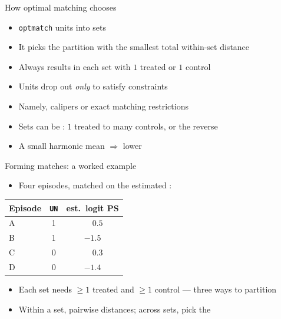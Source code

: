 \documentclass[table, xcolor = {dvipsnames}, 9pt]{beamer}
\theoremstyle{plain}
\newcommand{\mh}[1]{{\color{magenta}{#1}}}
\begin{document}
\begin{frame}[t]{How optimal matching chooses}
\vfill
\begin{itemize} \vfill
\item \texttt{optmatch} \mh{partitions} units into sets \citep{hansen2004} \vfill
\item It picks the partition with the smallest total within-set distance \\ \citep{rosenbaum1991,gurosenbaum1993,hansen2004} \vfill
\item[] Always results in each set with $1$ treated or $1$ control \vfill
\item Units drop out \emph{only} to satisfy constraints \vfill 
\item[] Namely, calipers or exact matching restrictions \vfill
\item Sets can be \mh{lopsided}: $1$ treated to many controls, or the reverse \vfill 
\item[] A small harmonic mean $\Rightarrow$ lower \mh{effective sample size} \vfill
\end{itemize} \vfill
\end{frame}
\begin{frame}[t]{Forming matches: a worked example}
\vfill
\begin{itemize} \vfill
\item Four episodes, matched on the estimated \mh{logit propensity score}: \vfill
\end{itemize}
\begin{table}[H]
\centering \footnotesize
\begin{tabular}{lcc}
\toprule
Episode & \texttt{UN} & est.\ logit PS \\
\midrule
A & 1 & $\phantom{-}0.5$ \\
B & 1 & $-1.5$ \\
C & 0 & $\phantom{-}0.3$ \\
D & 0 & $-1.4$ \\
\bottomrule
\end{tabular}
\end{table}
\begin{itemize} \vfill
\item Each set needs $\ge 1$ treated and $\ge 1$ control --- three ways to partition \vfill
\item Within a set, \mh{sum} pairwise distances; across sets, pick the \mh{smallest total} \vfill
\end{itemize} \vfill
\end{frame}
\end{document}
